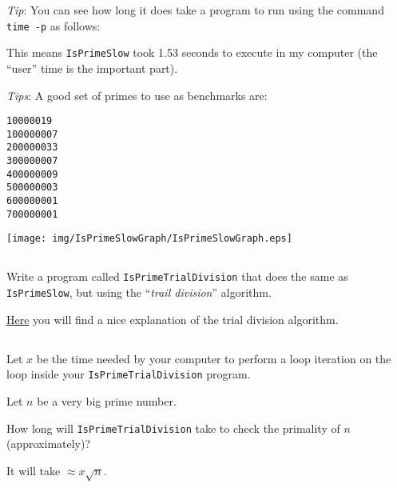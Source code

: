 \documentclass[a4paper, 12pt]{article}
\begin{document}
\textsl{Tip}: You can see how long it does take a program to run using the
command \texttt{time -p} as follows:


This means \texttt{IsPrimeSlow} took 1.53 seconds to execute in my
computer (the ``user'' time is the important part).

\textsl{Tips}: A good set of primes to use as benchmarks are:

\begin{verbatim}
10000019
100000007
200000033
300000007
400000009
500000003
600000001
700000001
\end{verbatim}

\begin{solution}
  \centering
  \texttt{[image: img/IsPrimeSlowGraph/IsPrimeSlowGraph.eps]}
\end{solution}

\subsection{}

Write a program called \texttt{IsPrimeTrialDivision} that does the same as
\texttt{IsPrimeSlow}, but using the ``\emph{trail division}'' algorithm.

\href{https://www.khanacademy.org/computing/computer-science/cryptography/comp-number-theory/a/trial-divisionalgorithm}{Here}
you will find a nice explanation of the trial division algorithm.


\subsection{}

Let $x$ be the time needed by your computer to perform a loop iteration on the
loop inside your \texttt{IsPrimeTrialDivision} program.

Let $n$ be a very big prime number.

How long will \texttt{IsPrimeTrialDivision} take to check the primality of $n$
(approximately)?

\begin{solution}
It will take $\approx x$.
\end{solution}
\end{document}
